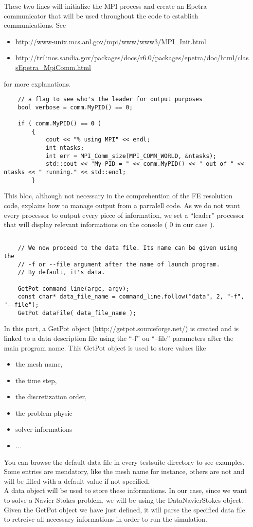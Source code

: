 These two lines will initialize the MPI process and create an Epetra communicator
that will be used throughout the code to establish communications. See
\begin{itemize}
\item \url{http://www-unix.mcs.anl.gov/mpi/www/www3/MPI\_Init.html}
\item \url{http://trilinos.sandia.gov/packages/docs/r6.0/packages/epetra/doc/html/classEpetra\_MpiComm.html}
\end{itemize}
for more explanations.

\begin{verbatim}
    // a flag to see who's the leader for output purposes
    bool verbose = comm.MyPID() == 0;

    if ( comm.MyPID() == 0 )
        {
            cout << "% using MPI" << endl;
            int ntasks;
            int err = MPI_Comm_size(MPI_COMM_WORLD, &ntasks);
            std::cout << "My PID = " << comm.MyPID() << " out of " << ntasks << " running." << std::endl;
        }
\end{verbatim}
This bloc, although not necessary in the comprehention of the FE resolution code, explains
how to manage output from a parralell code. As we do not want every processor to output
every piece of information, we set a ``leader'' processor that will display relevant
informations on the console ( 0 in our case ).
\begin{verbatim}

    // We now proceed to the data file. Its name can be given using the
    // -f or --file argument after the name of launch program.
    // By default, it's data.

    GetPot command_line(argc, argv);
    const char* data_file_name = command_line.follow("data", 2, "-f", "--file");
    GetPot dataFile( data_file_name );

\end{verbatim}

\noident In this part, a GetPot object (http://getpot.sourceforge.net/) is created
and is linked to a data description file using  the ``-f'' ou ``--file'' parameters after
the main program name. This GetPot object is used to store values like
\begin{itemize}
\item the mesh name,
\item the time step,
\item the discretization order,
\item the problem physic
\item solver informations
\item ...
\end{itemize}
You can browse the default data file in every testsuite directory to see examples.
Some entries are mendatory, like the mesh name for instance, others are not and will be
filled with a default value if not specified.\\
A data object will be used to store these informations. In our case, since we want to
solve a Navier-Stokes problem, we will be using the DataNavierStokes object.
Given the GetPot object we have just defined, it will parse the specified data file
to retreive all necessary informations in order to run the simulation.

